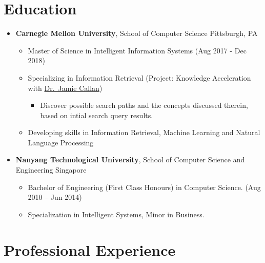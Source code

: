 
\section{Education}\label{education}

\begin{itemize}
\tightlist
\item
  \textbf{Carnegie Mellon University}, School of Computer Science
  \hfill Pittsburgh, PA

  \begin{itemize}
  \tightlist
  \item
    Master of Science in Intelligent Information Systems \hfill (Aug
    2017 - Dec 2018)
  \item
    Specializing in Information Retrieval (Project: Knowledge
    Acceleration with \href{http://www.cs.cmu.edu/~callan/}{Dr.~Jamie
    Callan})

    \begin{itemize}
    \tightlist
    \item
      Discover possible search paths and the concepts discussed therein,
      based on intial search query results.
    \end{itemize}
  \item
    Developing skills in Information Retrieval, Machine Learning and
    Natural Language Processing
  \end{itemize}
\item
  \textbf{Nanyang Technological University}, School of Computer Science
  and Engineering \hfill Singapore

  \begin{itemize}
  \tightlist
  \item
    Bachelor of Engineering (First Class Honours) in Computer Science.
    \hfill (Aug 2010 -- Jun 2014)
  \item
    Specialization in Intelligent Systems, Minor in Business.
  \end{itemize}
\end{itemize}

\section{Professional Experience}\label{professional-experience}

